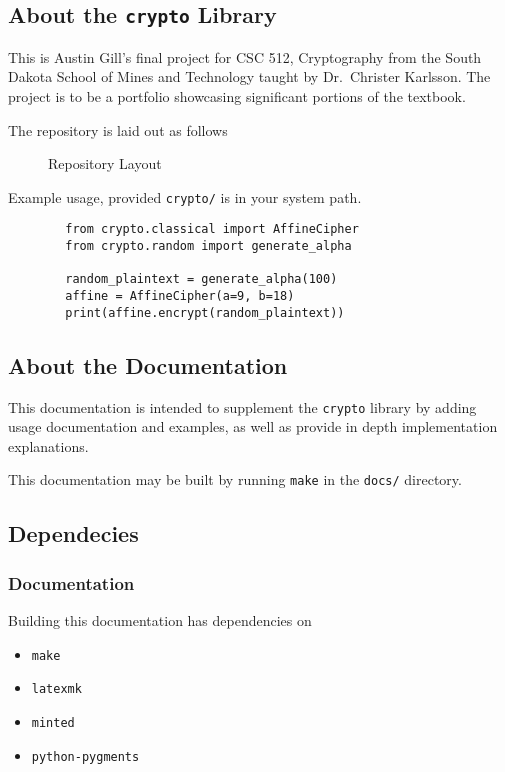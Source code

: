 
\subsection{About the \texttt{crypto} Library}
    This is Austin Gill's final project for CSC 512, Cryptography from the South Dakota School of Mines and Technology taught by Dr.\ Christer Karlsson. The project is to be a portfolio showcasing significant portions of the textbook.

    The repository is laid out as follows

    \begin{figure}[H]
        \caption{Repository Layout}\label{repo-layout}
    \end{figure}

    Example usage, provided \texttt{crypto/} is in your system path.

    \begin{verbatim}
        from crypto.classical import AffineCipher
        from crypto.random import generate_alpha

        random_plaintext = generate_alpha(100)
        affine = AffineCipher(a=9, b=18)
        print(affine.encrypt(random_plaintext))
    \end{verbatim}

\subsection{About the Documentation}
    This documentation is intended to supplement the \texttt{crypto} library by adding usage documentation and examples, as well as provide in depth implementation explanations.

    This documentation may be built by running \texttt{make} in the \texttt{docs/} directory.

\subsection{Dependecies}
    \subsubsection{Documentation}
        Building this documentation has dependencies on
        \begin{itemize}
            \item \texttt{make}
            \item \texttt{latexmk}
            \item \texttt{minted}
            \item \texttt{python-pygments}
        \end{itemize}


